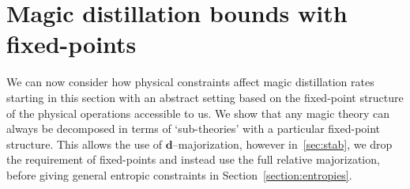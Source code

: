 \documentclass[pra,
aps,
twocolumn,
superscriptaddress,
groupedaddress,
nofootinbib,
reprint
]{revtex4-1}
\begin{document}
\section{Magic distillation bounds with fixed-points}
\label{sec:frag}

We can now consider how physical constraints affect magic distillation rates starting in this section with an abstract setting based on the fixed-point structure of the physical operations accessible to us. We show that any magic theory can always be decomposed in terms of `sub-theories' with a particular fixed-point structure. This allows the use of $\mathbf{d}$--majorization, however in~\cref{sec:stab}, we drop the requirement of fixed-points and instead use the full relative majorization, before giving general entropic constraints in Section~\ref{section:entropies}.
 
\end{document}
